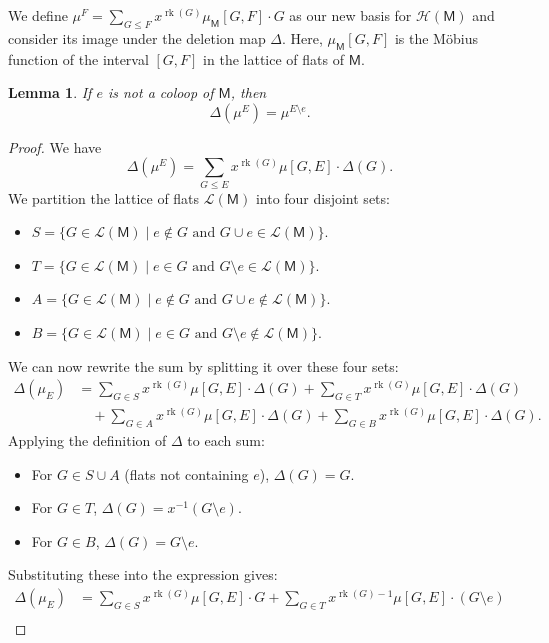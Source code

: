 \documentclass[11pt, a4paper, english]{amsart}
\theoremstyle{teoremas}
\newtheorem{lemma}[theorem]{Lemma}
\theoremstyle{definition}
\DeclareMathOperator{\rk}{rk}
\newcommand{\M}{\mathsf{M}}
\newcommand{\cL}{\mathcal{L}}
\begin{document}
We define $\mu^F = \sum_{G\leq F} x^{\rk(G)}\mu_{\M}[G,F]\cdot G$ as our new basis for $\mathcal{H}(\M)$ and consider
its image under the deletion map $\Delta$. Here, $\mu_{\M}[G,F]$ is the
Möbius function of the interval $[G,F]$ in the lattice of flats of $\M$.

\begin{lemma}
    If $e$ is not a coloop of $\M$, then
    \[
        \Delta(\mu^E) = \mu^{E\setminus e}.
    \]
\end{lemma}

\begin{proof}
    We have
    \[
        \Delta(\mu^E) = \sum_{G\leq E} x^{\rk(G)}\mu[G,E]\cdot \Delta(G).
    \]
    We partition the lattice of flats $\cL(\M)$ into four disjoint sets:
    \begin{itemize}
        \item $S = \{G\in \cL(\M)\mid e \notin G \text{ and } G\cup e \in \cL(\M)\}$.
        \item $T = \{G\in \cL(\M)\mid e \in G \text{ and } G\setminus e \in \cL(\M)\}$.
        \item $A = \{G\in \cL(\M)\mid e \notin G \text{ and } G\cup e \notin \cL(\M)\}$.
        \item $B = \{G\in \cL(\M)\mid e \in G \text{ and } G\setminus e \notin \cL(\M)\}$.
    \end{itemize}
    We can now rewrite the sum by splitting it over these four sets:
    \begin{align*}
        \Delta(\mu_E) & = \sum_{G \in S} x^{\rk(G)}\mu[G,E]\cdot \Delta(G) + \sum_{G \in T} x^{\rk(G)}\mu[G,E]\cdot \Delta(G)       \\
                      & \quad+ \sum_{G \in A} x^{\rk(G)}\mu[G,E]\cdot \Delta(G) + \sum_{G \in B} x^{\rk(G)}\mu[G,E]\cdot \Delta(G).
    \end{align*}
    Applying the definition of $\Delta$ to each sum:
    \begin{itemize}
        \item For $G \in S \cup A$ (flats not containing $e$), $\Delta(G) = G$.
        \item For $G \in T$, $\Delta(G) = x^{-1}(G\setminus e)$.
        \item For $G \in B$, $\Delta(G) = G\setminus e$.
    \end{itemize}
    Substituting these into the expression gives:
    \begin{align*}
        \Delta(\mu_E) & = \sum_{G \in S} x^{\rk(G)}\mu[G,E]\cdot G + \sum_{G \in T} x^{\rk(G)-1}\mu[G,E]\cdot (G\setminus e)     \\

\end{align*}
\end{proof}
\end{document}
